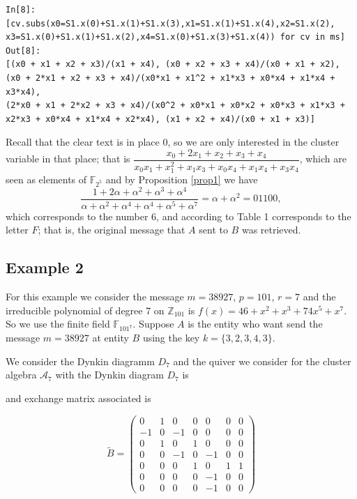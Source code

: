 \documentclass[12pt,a4paper]{article}
\begin{document}
\begin{verbatim}
In[8]: [cv.subs(x0=S1.x(0)+S1.x(1)+S1.x(3),x1=S1.x(1)+S1.x(4),x2=S1.x(2),
x3=S1.x(0)+S1.x(1)+S1.x(2),x4=S1.x(0)+S1.x(3)+S1.x(4)) for cv in ms]
Out[8]:
[(x0 + x1 + x2 + x3)/(x1 + x4), (x0 + x2 + x3 + x4)/(x0 + x1 + x2),
(x0 + 2*x1 + x2 + x3 + x4)/(x0*x1 + x1^2 + x1*x3 + x0*x4 + x1*x4 + x3*x4),
(2*x0 + x1 + 2*x2 + x3 + x4)/(x0^2 + x0*x1 + x0*x2 + x0*x3 + x1*x3 + 
x2*x3 + x0*x4 + x1*x4 + x2*x4), (x1 + x2 + x4)/(x0 + x1 + x3)]

\end{verbatim}

Recall that the clear text is in place 0, so we are only interested in the cluster variable in that place; that is $\dfrac{x_0 + 2x_1 + x_2 + x_3 + x_4}{x_0x_1 + x_1^2 + x_1x_3 + x_0x_4 + x_1x_4+x_3x_4}$, which are seen as elements of  $\mathbb{F}_{2^5}$ and by Proposition \ref{prop1} we have
$$\dfrac{1+2\alpha + \alpha^2 + \alpha^3 + \alpha^4}{\alpha + \alpha^2 + \alpha^4 + \alpha^4 + \alpha^5 + \alpha^7}= \alpha + \alpha^2 = 01100,$$ which corresponds to the number 6, and according to Table 1 corresponds to the letter $F$; that is, the original message that $ A $ sent to $ B $ was retrieved.

\subsection*{Example 2}

For this example we consider the message $m=38927$, $p=101$, $r=7$ and the irreducible polynomial of degree 7 on $\mathbb{Z}_{101}$ is $f(x)=46+x^2+x^3+74x^5+x^7$. So we use the finite field $\mathbb{F}_{101^7}$. Suppose $A$ is the entity who want send the message $m=38927$ at entity $B$ using the key $k=\{ 3,2,3,4,3 \}$. 

We consider the Dynkin diagramm $D_7$ and the quiver we consider for the cluster algebra $\mathcal{A}_7$ with the Dynkin diagram $D_7$ is


\begin{center}
\hspace{0.5cm}
\end{center} and exchange matrix associated is

\begin{equation*}
\tilde{B}=\left( 
\begin{array}{ccccccc}
0 & 1 & 0 & 0 & 0 & 0 & 0 \\
-1 & 0 & -1 & 0 & 0 & 0 & 0\\
0 & 1 & 0 & 1 & 0 & 0 & 0\\
0 & 0 & -1 & 0 & -1 & 0 & 0\\
0 & 0 & 0 & 1 & 0 & 1 & 1 \\
0 & 0 & 0 & 0 & -1 & 0 & 0 \\
0 & 0 & 0 & 0 & -1 & 0 & 0 
\end{array}
\right) 
\end{equation*}
\end{document}
